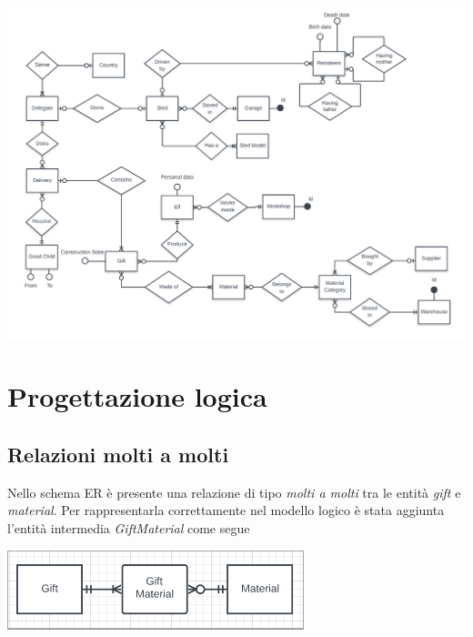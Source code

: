 \documentclass[12pt]{report}
\begin{document}
\begin{center}
\includegraphics[width=1.3\linewidth]{ErComplete.png}
\end{center}
\section{Progettazione logica}

\subsection{Relazioni molti a molti}
Nello schema ER è presente una relazione di tipo \textit{molti a molti} tra le entità \textit{gift} e
\textit{material}. Per rappresentarla correttamente nel modello logico è stata aggiunta l'entità intermedia 
\textit{GiftMaterial} come segue

\begin{center}
\includegraphics[scale=0.7]{m2m.png}
\end{center}
\end{document}
